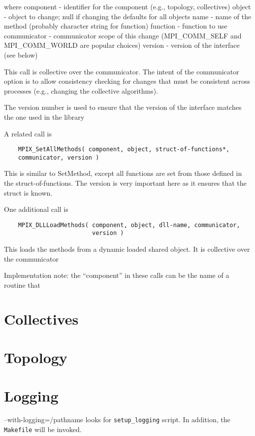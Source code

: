 \documentclass{report}
\begin{document}
where
    component - identifier for the component (e.g., topology,
    collectives)
    object    - object to change; null if changing the defaults for
    all objects
    name      - name of the method (probably character string for function)
    function  - function to use
    communicator - communicator scope of this change (MPI\_COMM\_SELF
    and MPI\_COMM\_WORLD are popular choices)
    version   - version of the interface (see below)

    This call is collective over the communicator.  The intent of the 
    communicator option is to allow consistency checking for changes
    that must be consistent across processes (e.g., changing the
    collective algorithms).

    The version number is used to ensure that the version of the
    interface matches the one used in the library

A related call is

\begin{verbatim}
    MPIX_SetAllMethods( component, object, struct-of-functions*,
    communicator, version )
\end{verbatim}

This is similar to SetMethod, except all functions are set from those
defined in the struct-of-functions.  The version is very important
here as it ensures that the struct is known.

One additional call is

\begin{verbatim}
    MPIX_DLLLoadMethods( component, object, dll-name, communicator,
                         version )
\end{verbatim}

This loads the methods from a dynamic loaded shared object.  It is
collective over the communicator

Implementation note: the ``component'' in these calls can be the name
of a routine that 

\section{Collectives}
\section{Topology}
\section{Logging}
    --with-logging=/pathname
looks for \texttt{setup\_logging} script.  In addition, the
\texttt{Makefile} will be invoked.
\end{document}

